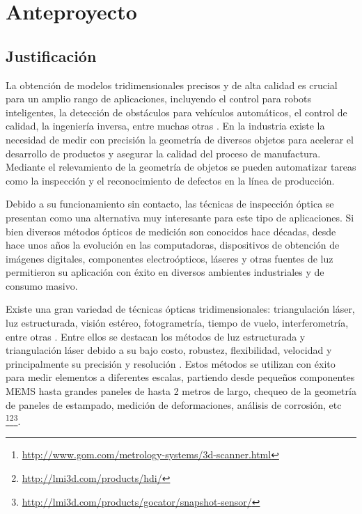 \chapter{Anteproyecto}\label{ch:anteproyecto}

\section{Justificación}
La obtención de modelos tridimensionales precisos y de alta calidad es crucial para un amplio rango de aplicaciones, incluyendo el control para robots inteligentes, la detección de obstáculos para vehículos automáticos, el control de calidad, la ingeniería inversa, entre muchas otras \cite{chen2000overview}. En la industria existe la necesidad de medir con precisión la geometría de diversos objetos para acelerar el desarrollo de productos y asegurar la calidad del proceso de manufactura. Mediante el relevamiento de la geometría de objetos se pueden automatizar tareas como la inspección y el reconocimiento de defectos en la línea de producción.

Debido a su funcionamiento sin contacto, las técnicas de inspección óptica se presentan como una alternativa muy interesante para este tipo de aplicaciones. Si bien diversos métodos ópticos de medición son conocidos hace décadas, desde hace unos años la evolución en las computadoras, dispositivos de obtención de imágenes digitales, componentes electroópticos, láseres y otras fuentes de luz permitieron su aplicación con éxito en diversos ambientes industriales y de consumo masivo.

Existe una gran variedad de técnicas ópticas tridimensionales: triangulación láser, luz estructurada, visión estéreo, fotogrametría, tiempo de vuelo, interferometría, entre otras \cite{sansoni2009state}. Entre ellos se destacan los métodos de luz estructurada y triangulación láser debido a su bajo costo, robustez, flexibilidad, velocidad y principalmente su precisión y resolución \cite{gorthi2010fringe}. Estos métodos se utilizan con éxito para medir elementos a diferentes escalas, partiendo desde pequeños componentes MEMS hasta grandes paneles de hasta 2 metros de largo, chequeo de la geometría de paneles de estampado, medición de deformaciones, análisis de corrosión, etc \footnote{\url{http://www.gom.com/metrology-systems/3d-scanner.html}}\footnote{\url{http://lmi3d.com/products/hdi/}}\footnote{\url{http://lmi3d.com/products/gocator/snapshot-sensor/}}.

